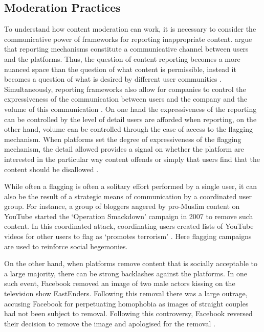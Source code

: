 \subsection{Moderation Practices}
To understand how content moderation can work, it is necessary to consider the communicative power of frameworks for reporting inappropriate content.
\citet{Crawford:2016} argue that reporting mechanisms constitute a communicative channel between users and the platforms.
Thus, the question of content reporting becomes a more nuanced space than the question of what content is permissible, instead it becomes a question of what is desired by different user communities \citep{Crawford:2016}.
Simultaneously, reporting frameworks also allow for companies to control the expressiveness of the communication between users and the company and the volume of this communication \citep{Crawford:2016}.
On one hand the expressiveness of the reporting can be controlled by the level of detail users are afforded when reporting, on the other hand, volume can be controlled through the ease of access to the flagging mechanism.
When platforms set the degree of expressiveness of the flagging mechanism, the detail allowed provides a signal on whether the platform are interested in the particular way content offends or simply that users find that the content should be disallowed \citep{Crawford:2016}.

While often a flagging is often a solitary effort performed by a single user, it can also be the result of a strategic means of communication by a coordinated user group.
For instance, a group of bloggers angered by pro-Muslim content on YouTube started the `Operation Smackdown' campaign in 2007 to remove such content.
In this coordinated attack, coordinating users created lists of YouTube videos for other users to flag as `promotes terrorism' \citep{Crawford:2016}.
Here flagging campaigns are used to reinforce social hegemonies.

On the other hand, when platforms remove content that is socially acceptable to a large majority, there can be strong backlashes against the platforms.
In one such event, Facebook removed an image of two male actors kissing on the television show EastEnders.
Following this removal there was a large outrage, accusing Facebook for perpetuating homophobia as images of straight couples had not been subject to removal.
Following this controversy, Facebook reversed their decision to remove the image and apologised for the removal \citep{Crawford:2016}.

